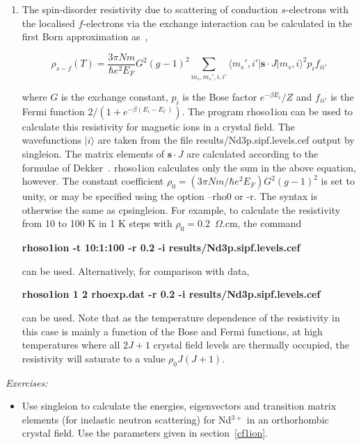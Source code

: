 \begin{enumerate}
\item The spin-disorder resistivity due to scattering of conduction $s$-electrons with the localised
$f$-electrons via the exchange interaction can be calculated in the first Born approximation as~\cite{raowallace},

\begin{equation} \label{eq:cfres}
\rho_{s-f}(T) = \frac{3\pi N m}{\hbar e^2 E_F} G^2(g-1)^2 \sum_{m_s,m_s',i,i'} 
      \langle m_s',i' | {\mathbf s \cdot J} | m_s, i \rangle^2 p_i f_{ii'}
\end{equation}

\noindent where $G$ is the exchange constant, $p_i$ is the Bose factor $e^{-\beta E_i}/Z$ and $f_{ii'}$ is the
Fermi function $2/(1+e^{-\beta(E_i-E_{i'})})$. The program {\prg rhoso1ion} can be used to calculate this
resistivity for magnetic ions in a crystal field. The wavefunctions $|i\rangle$ are taken from the file {\prg
results/Nd3p.sipf.levels.cef} output by {\prg singleion}. The matrix elements of ${\mathbf s \cdot J}$ are calculated according to
the formulae of Dekker~\cite{dekker}. {\prg rhoso1ion} calculates only the sum in the above equation, however.
The constant coefficient $\rho_0=(3\pi N m/\hbar e^2 E_F) G^2(g-1)^2$ is set to unity, or may be specified using
the option {\prg --rho0} or {\prg -r}. The syntax is otherwise the same as {\prg cpsingleion}. For example, to
calculate the resistivity from 10 to 100 K in 1 K steps with $\rho_0 = 0.2$~$\Omega$.cm, the command 

{\bf rhoso1ion -t 10:1:100 -r 0.2 -i results/Nd3p.sipf.levels.cef}

 can be used. Alternatively, for comparison with data,

 {\bf rhoso1ion 1 2 rhoexp.dat -r 0.2 -i results/Nd3p.sipf.levels.cef} 

can be used. Note that as the temperature dependence of the resistivity in this case is mainly a
function of the Bose and Fermi functions, at high temperatures where all $2J+1$ crystal field levels are
thermally occupied, the resistivity will saturate to a value $\rho_0 J(J+1)$.

\end{enumerate}

\vspace{1cm}
{\em Exercises:}
\begin{itemize}
\item Use {\prg singleion} to calculate the energies, eigenvectors and
transition matrix elements (for inelastic
neutron scattering) for Nd$^{3+}$ in an orthorhombic crystal field.
Use the parameters given in section~\ref{cf1ion}.
\end{itemize}



